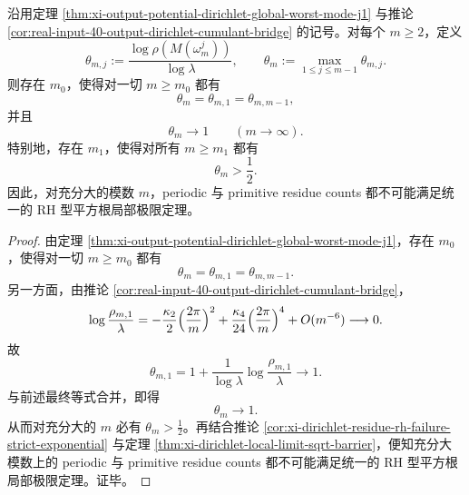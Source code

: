 \begin{theorem}\label{thm:xi-output-potential-dirichlet-index-to-one-all-moduli}
沿用定理 \ref{thm:xi-output-potential-dirichlet-global-worst-mode-j1} 与推论 \ref{cor:real-input-40-output-dirichlet-cumulant-bridge} 的记号。对每个 \(m\ge 2\)，定义
\[
\theta_{m,j}:=\frac{\log\rho(M(\omega_m^j))}{\log\lambda},
\qquad
\theta_m:=\max_{1\le j\le m-1}\theta_{m,j}.
\]
则存在 \(m_0\)，使得对一切 \(m\ge m_0\) 都有
\[
\theta_m=\theta_{m,1}=\theta_{m,m-1},
\]
并且
\[
\theta_m\longrightarrow 1
\qquad(m\to\infty).
\]
特别地，存在 \(m_1\)，使得对所有 \(m\ge m_1\) 都有
\[
\theta_m>\frac12.
\]
因此，对充分大的模数 \(m\)，periodic 与 primitive residue counts 都不可能满足统一的 RH 型平方根局部极限定理。
\end{theorem}
\begin{proof}
由定理 \ref{thm:xi-output-potential-dirichlet-global-worst-mode-j1}，存在 \(m_0\)，使得对一切 \(m\ge m_0\) 都有
\[
\theta_m=\theta_{m,1}=\theta_{m,m-1}.
\]
另一方面，由推论 \ref{cor:real-input-40-output-dirichlet-cumulant-bridge}，
\[
\log\frac{\rho_{m,1}}{\lambda}
=
-\frac{\kappa_2}{2}\Bigl(\frac{2\pi}{m}\Bigr)^2
+\frac{\kappa_4}{24}\Bigl(\frac{2\pi}{m}\Bigr)^4
+O(m^{-6})
\longrightarrow 0.
\]
故
\[
\theta_{m,1}
=
1+\frac{1}{\log\lambda}\log\frac{\rho_{m,1}}{\lambda}
\longrightarrow 1.
\]
与前述最终等式合并，即得
\[
\theta_m\longrightarrow 1.
\]
从而对充分大的 \(m\) 必有 \(\theta_m>\frac12\)。再结合推论
\ref{cor:xi-dirichlet-residue-rh-failure-strict-exponential} 与定理
\ref{thm:xi-dirichlet-local-limit-sqrt-barrier}，便知充分大模数上的 periodic 与 primitive residue counts 都不可能满足统一的 RH 型平方根局部极限定理。证毕。
\end{proof}

